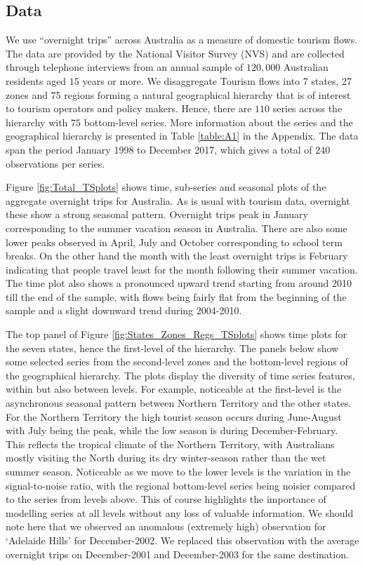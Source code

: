 \documentclass[12pt]{article}
\theoremstyle{definition}
\theoremstyle{property}
\begin{document}
	
	\subsection{Data}
	
	We use ``overnight trips'' across Australia as a measure of domestic tourism flows. The data are provided by the National Visitor Survey (NVS) and are collected through telephone interviews from an annual sample of $120,000$ Australian residents aged $15$ years or more. We disaggregate Tourism flows into 7 states, 27 zones and 75 regions forming a natural geographical hierarchy that is of interest to tourism operators and policy makers. Hence, there are $110$ series across the hierarchy with $75$ bottom-level series. More information about the series and the geographical hierarchy is presented in Table \ref{table:A1} in the Appendix. The data span the period January 1998 to December 2017, which gives a total of $240$ observations per series.

Figure \ref{fig:Total_TSplots} shows time, sub-series and seasonal plots of the aggregate overnight trips for Australia. As is usual with tourism data, overnight these show a strong seasonal pattern. Overnight trips peak in January corresponding to the summer vacation season in Australia. There are also some lower peaks observed in April, July and October corresponding to school term breaks. On the other hand the month with the least overnight trips is February indicating that people travel least for the month following their summer vacation. The time plot also shows a pronounced upward trend starting from around 2010 till the end of the sample, with flows being fairly flat from the beginning of the sample and a slight downward trend during 2004-2010.

The top panel of Figure \ref{fig:States_Zones_Regs_TSplots} shows time plots for the seven states, hence the first-level of the hierarchy. The panels below show some selected series from the second-level zones and the bottom-level regions of the geographical hierarchy. The plots display the diversity of time series features, within but also between levels. For example, noticeable at the first-level is the asynchronous seasonal pattern between Northern Territory and the other states. For the Northern Territory the high tourist season occurs during June-August with July being the peak, while the low season is during December-February. This reflects the tropical climate of the Northern Territory, with Australians mostly visiting the North during its dry winter-season rather than the wet summer season. Noticeable as we move to the lower levels is the variation in the signal-to-noise ratio, with the regional bottom-level series being noisier compared to the series from levels above. This of course highlights the importance of modelling series at all levels without any loss of valuable information. We should note here that we observed an anomalous (extremely high) observation for `Adelaide Hills' for December-2002. We replaced this observation with the average overnight trips on December-2001 and December-2003 for the same destination.
\end{document}
